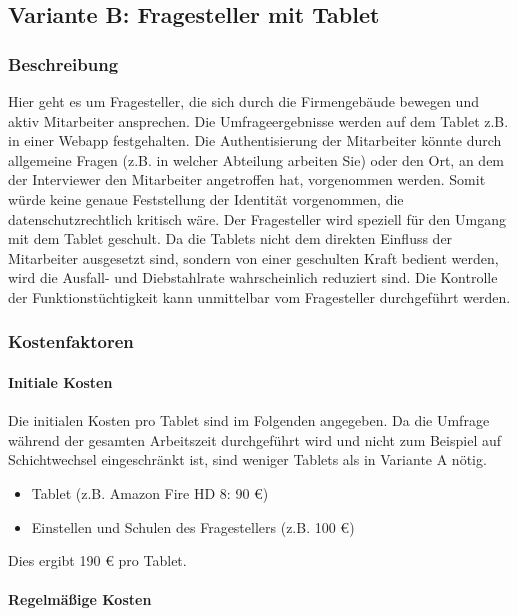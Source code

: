 \subsection{Variante B: Fragesteller mit Tablet}
\subsubsection{Beschreibung}
Hier geht es um Fragesteller, die sich durch die Firmengebäude bewegen und aktiv Mitarbeiter ansprechen. Die Umfrageergebnisse werden auf dem Tablet z.B. in einer Webapp festgehalten. Die Authentisierung der Mitarbeiter könnte durch allgemeine Fragen (z.B. in welcher Abteilung arbeiten Sie) oder den Ort, an dem der Interviewer den Mitarbeiter angetroffen hat, vorgenommen werden. Somit würde keine genaue Feststellung der Identität vorgenommen, die datenschutzrechtlich kritisch wäre. Der Fragesteller wird speziell für den Umgang mit dem Tablet geschult. Da die Tablets nicht dem direkten Einfluss der Mitarbeiter ausgesetzt sind, sondern von einer geschulten Kraft bedient werden, wird die Ausfall- und Diebstahlrate wahrscheinlich reduziert sind. Die Kontrolle der Funktionstüchtigkeit kann unmittelbar vom Fragesteller durchgeführt werden.

\subsubsection{Kostenfaktoren}

\paragraph{Initiale Kosten}
Die initialen Kosten pro Tablet sind im Folgenden angegeben. Da die Umfrage während der gesamten Arbeitszeit durchgeführt wird und nicht zum Beispiel auf Schichtwechsel eingeschränkt ist, sind weniger Tablets als in Variante A nötig.

\begin{itemize}
\item Tablet (z.B. Amazon Fire HD 8: 90 €)
\item Einstellen und Schulen des Fragestellers (z.B. 100 €)
\end{itemize}

Dies ergibt 190 € pro Tablet.

\paragraph{Regelmäßige Kosten}

